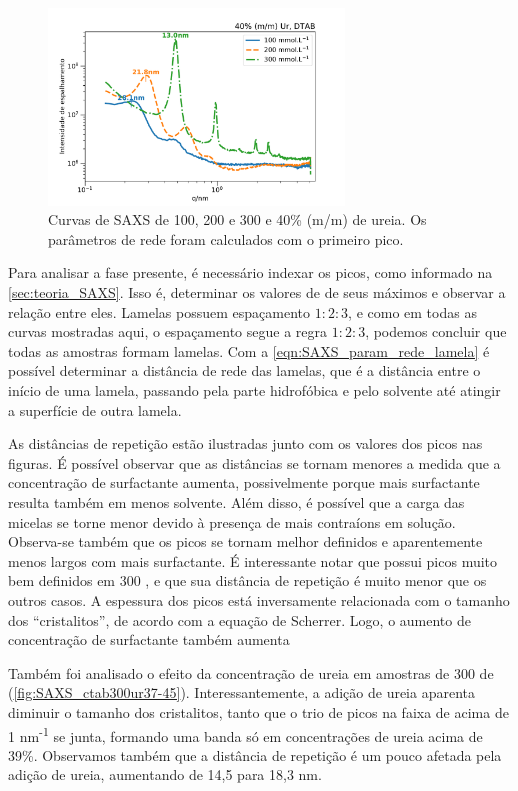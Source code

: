 	\begin{figure}[h]
		\centering
		\includegraphics[width=0.7\textwidth]{imagens/saxs/DTAB_conc}
		\caption{Curvas de SAXS de \DTAB{} 100, 200 e 300 \mM{} e 40\% (m/m) de ureia. Os parâmetros de rede foram calculados com o primeiro pico.}
		\label{fig:SAXS_dtabconc}
	\end{figure}
	
	Para analisar a fase presente, é necessário indexar os picos, como informado na \autoref{sec:teoria_SAXS}. Isso é, determinar os valores de \q{} de seus máximos e observar a relação entre eles. Lamelas possuem espaçamento \(1:2:3\), e como em todas as curvas mostradas aqui, o espaçamento segue a regra \(1:2:3\), podemos concluir que todas as amostras formam lamelas. Com a \autoref{eqn:SAXS_param_rede_lamela} é possível determinar a distância de rede das lamelas, que é a distância entre o início de uma lamela, passando pela parte hidrofóbica e pelo solvente até atingir a superfície de outra lamela.

	As distâncias de repetição estão ilustradas junto com os valores dos picos nas figuras. É possível observar que as distâncias se tornam menores a medida que a concentração de surfactante aumenta, possivelmente porque mais surfactante resulta também em menos solvente. Além disso, é possível que a carga das micelas se torne menor devido à presença de mais contraíons em solução. Observa-se também que os picos se tornam melhor definidos e aparentemente menos largos com mais surfactante. É interessante notar que \DTAB{} possui picos muito bem definidos em 300 \mM, e que sua distância de repetição é muito menor que os outros casos. A espessura dos picos está inversamente relacionada com o tamanho dos ``cristalitos'', de acordo com a equação de Scherrer.\cite{Kockrick2008} Logo, o aumento de concentração de surfactante também aumenta 
	
	Também foi analisado o efeito da concentração de ureia em amostras de 300 \mM{} de \CTAB{} (\autoref{fig:SAXS_ctab300ur37-45}). Interessantemente, a adição de ureia aparenta diminuir o tamanho dos cristalitos, tanto que o trio de picos na faixa de \q{} acima de 1 nm\textsuperscript{-1} se junta, formando uma banda só em concentrações de ureia acima de 39\%. Observamos também que a distância de repetição é um pouco afetada pela adição de ureia, aumentando de 14,5 para 18,3 nm.
	
